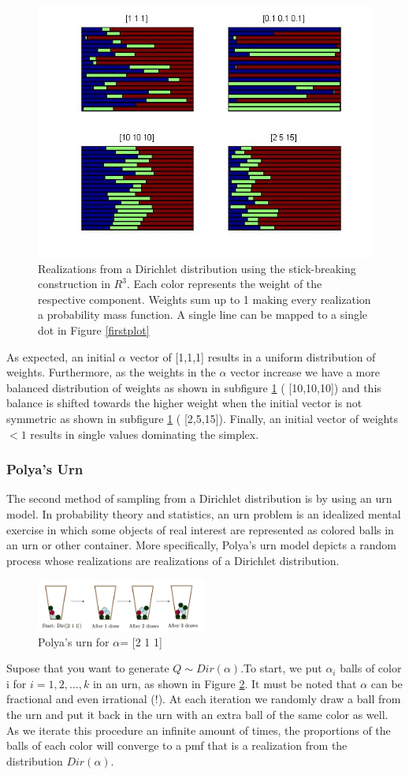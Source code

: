 \documentclass [twoside,hidelinks]{article}
\begin{document}
\begin{figure} [!h]
    \centerline{\includegraphics [width=.55\textwidth]{stickBreaking}}
    \caption{Realizations from a Dirichlet distribution using the stick-breaking construction in $R^3$. Each color represents the weight of the respective component. Weights sum up to 1 making every realization a probability mass function. A single line can be mapped to a single dot in Figure  \ref{firstplot}  }
\label{stickR3}
\end{figure}


As expected, an initial $\alpha$ vector of  [1,1,1] results in a uniform distribution of weights. Furthermore, as the weights in the $\alpha$ vector increase we have a more balanced distribution of weights as shown in subfigure \ref{stickR3} ( [10,10,10]) and this balance is shifted towards the higher weight when the initial vector is not symmetric as shown in subfigure \ref{stickR3} ( [2,5,15]). Finally, an initial vector of weights $<1$ results in single values dominating the simplex.
\subsubsection{Polya's Urn}

The second method of sampling from a Dirichlet distribution is by using an urn model. In probability theory and statistics, an urn problem is an idealized mental exercise in which some objects of real interest are represented as colored balls in an urn or other container. More specifically, Polya's urn model depicts a random process whose realizations are realizations of a Dirichlet distribution.

\begin{figure} [!h]
    \centerline{\includegraphics [width=0.5\textwidth]{urn}}
	\caption{Polya's urn for $\alpha$= [2 1 1] }
	\label{polysurn}
\end{figure}
Supose that you want to generate $Q \sim Dir ( \alpha ) $.To start, we put $\alpha_i$ balls of color i for $i=1,2,...,k$ in an urn, as shown in Figure \ref{polysurn}. It must be noted that $\alpha$ can be fractional and even irrational (!). At each iteration we randomly draw a ball from the urn and put it back in the urn with an extra ball of the same color as well. As we iterate this procedure an infinite amount of times, the proportions of the balls of each color will converge to a pmf that is a realization from the distribution $Dir (\alpha)$.
\end{document}
